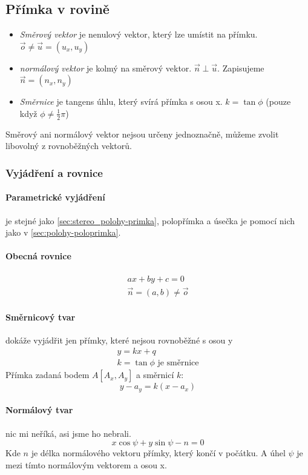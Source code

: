 \documentclass[12pt]{article}
\begin{document}
\subsection{Přímka v rovině}
\begin{itemize}
\item \emph{Směrový vektor} je nenulový vektor, který lze umístit na přímku. $ \vec{o} \neq\vec{u} = (u_x, u_y)$
\item \emph{normálový vektor} je kolmý na směrový vektor. $ \vec{n} \perp \vec{u}$. Zapisujeme $\vec{n} = (n_x, n_y)$
\item \emph{Směrnice} je tangens úhlu, který svírá přímka s osou x. $k = \tan \phi$ (pouze když $\phi \neq \frac{1}{2} \pi$)
\end{itemize}
Směrový ani normálový vektor nejsou určeny jednoznačně, můžeme zvolit libovolný z rovnoběžných vektorů.
\subsubsection{Vyjádření a rovnice}
\paragraph{Parametrické vyjádření} je stejné jako \ref{sec:stereo_polohy-primka}, polopřímka a úsečka je pomocí nich jako v \ref{sec:polohy-poloprimka}.
\paragraph{Obecná rovnice}
\begin{align}
ax +by +c = 0\\
\vec{n} = (a,b) \neq \vec{o}
\end{align}
\paragraph{Směrnicový tvar} dokáže vyjádřit jen přímky, které nejsou rovnoběžné s osou y
\begin{align}
y = k x + q\\
k = \tan \phi \text{ je směrnice}
\end{align}
Přímka zadaná bodem $A[A_x,A_y]$ a směrnicí $k$:
\begin{equation}
y - a_y = k(x -a_x)
\end{equation}
\paragraph{Normálový tvar} nic mi neříká, asi jsme ho nebrali.
\begin{equation}
x \cos \psi + y \sin \psi - n = 0
\end{equation}
Kde $n$ je délka normálového vektoru přímky, který končí v počátku. A úhel $\psi$ je mezi tímto normálovým vektorem a osou x.
\end{document}
